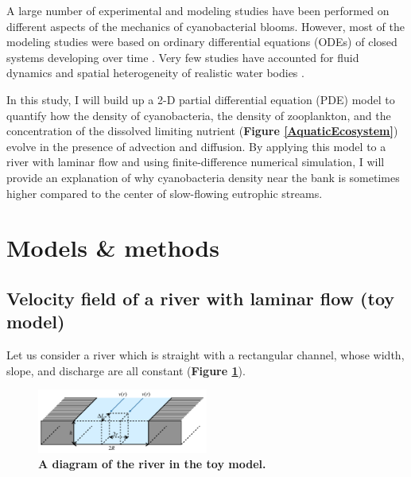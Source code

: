 \documentclass{article}
\begin{document}
A large number of experimental and modeling studies have been performed on different aspects of the mechanics of cyanobacterial blooms. However, most of the modeling studies were based on ordinary differential equations (ODEs) of closed systems developing over time \cite{SteeleHenderson, DumitranVuta}. Very few studies have accounted for fluid dynamics and spatial heterogeneity of realistic water bodies \cite{2D-B, ZhaoTianWei}.

In this study, I will build up a 2-D partial differential equation (PDE) model to quantify how the density of cyanobacteria, the density of zooplankton, and the concentration of the dissolved limiting nutrient (\textbf{Figure \ref{AquaticEcosystem}}) evolve in the presence of advection and diffusion. By applying this model to a river with laminar flow and using finite-difference numerical simulation, I will provide an explanation of why cyanobacteria density near the bank is sometimes higher compared to the center of slow-flowing eutrophic streams.

\section*{Models \& methods}
\subsection*{Velocity field of a river with laminar flow (toy model)}
Let us consider a river which is straight with a rectangular channel, whose width, slope, and discharge are all constant (\textbf{Figure \ref{ToyRiverVelocityProfile}}).

\begin{figure}[h]
    \centering
    \captionsetup{justification=centering}
    \includegraphics[width=0.5\textwidth]{ToyRiverDiagram.pdf}
    \caption{\textbf{A diagram of the river in the toy model.}}
    \label{ToyRiverVelocityProfile}
\end{figure}
\end{document}
